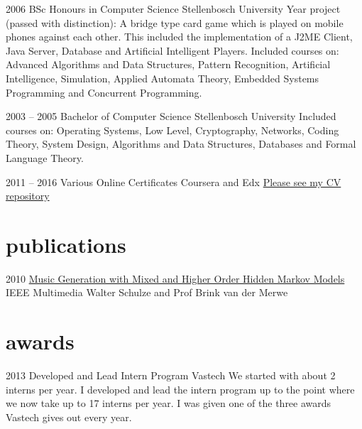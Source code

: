 \documentclass[]{friggeri-cv-a4} %
\begin{document}
\begin{entrylist}

\entry
{2006}
{BSc Honours {\normalfont in Computer Science}}
{Stellenbosch University}
{Year project (passed with distinction): A bridge type card game which is played on mobile phones against each other. This included the implementation of a J2ME Client, Java Server, Database and Artificial Intelligent Players.
Included courses on: Advanced Algorithms and Data Structures, Pattern Recognition, Artificial Intelligence, Simulation, Applied Automata Theory, Embedded Systems Programming and Concurrent Programming.}

\entry
{2003 -- 2005}
{Bachelor {\normalfont of Computer Science}}
{Stellenbosch University}
{Included courses on: Operating Systems, Low Level, Cryptography, Networks, Coding Theory, System Design, Algorithms and Data Structures, Databases and Formal Language Theory.}

\entry
{2011 -- 2016}
{Various Online Certificates}
{Coursera and Edx}
{\href{https://github.com/awalterschulze/waltercv}{Please see my CV repository}}

\end{entrylist}

\section{publications}

\begin{entrylist}

\entry
{2010}
{\href{http://doi.ieeecomputersociety.org/10.1109/MMUL.2010.44}{Music Generation with Mixed and Higher Order Hidden Markov Models}}
{IEEE Multimedia}
{Walter Schulze and Prof Brink van der Merwe}

\end{entrylist}

\newpage

\section{awards}

\begin{entrylist}

\entry
{2013}
{Developed and Lead Intern Program}
{Vastech}
{We started with about 2 interns per year. I developed and lead the intern program up to the point where we now take up to 17 interns per year.  I was given one of the three awards Vastech gives out every year.}

\end{entrylist}
\end{document}
